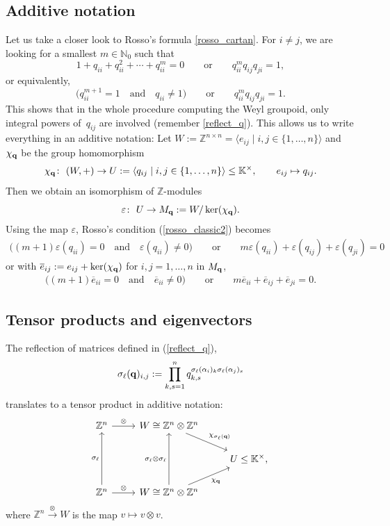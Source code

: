\documentclass[10pt,a4paper]{amsart}
\numberwithin{equation}{section}
\newcommand{\NN }{\mathbb{N}}
\newcommand{\ZZ }{\mathbb{Z}}
\newcommand{\qq }{{\bf q}}
\newcommand{\KK }{\mathbb{K}}
\newcommand{\bich }{\chi}
\begin{document}
\subsection{Additive notation}\label{add_not}
Let us take a closer look to Rosso's formula \eqref{rosso_cartan}. For $i\ne j$, we are looking for a smallest $m\in\NN_0$ such that
\begin{equation*}%
1+q_{ii}+q_{ii}^2+\cdots+q_{ii}^m=0 \qquad\text{or}\qquad q_{ii}^m q_{ij}q_{ji}=1,
\end{equation*}
or equivalently,
\begin{equation}\label{rosso_classic2}
\big(q_{ii}^{m+1}=1\quad\text{and}\quad q_{ii}\ne 1\big) \qquad\text{or}\qquad q_{ii}^m q_{ij}q_{ji}=1.
\end{equation}
This shows that in the whole procedure computing the Weyl groupoid, only integral powers of~$q_{ij}$ are involved (remember \eqref{reflect_q}).
This allows us to write everything in an additive notation:
Let $W:=\ZZ^{n\times n} = \langle e_{ij}\mid i,j\in \{1,\dots,n\}\rangle$ and $\bich_\qq$ be the group homomorphism
\[ \bich_\qq \colon \ (W,+) \rightarrow U:=\langle q_{ij} \mid i,j\in \{1,\dots,n\}\rangle\le \KK^\times,
\qquad e_{ij}\mapsto q_{ij}. \]
Then we obtain an isomorphism of $\ZZ$-modules
\[ \varepsilon \colon \ U \rightarrow M_\qq:=W/\ker(\bich_\qq). \]
Using the map $\varepsilon$, Rosso's condition (\ref{rosso_classic2}) becomes
\begin{gather*}%
\big((m+1)\varepsilon(q_{ii})=0\quad\text{and}\quad \varepsilon(q_{ii})\ne 0\big) \qquad\text{or}\qquad m\varepsilon(q_{ii})+\varepsilon(q_{ij})+\varepsilon(q_{ji})=0
\end{gather*}
or with $\overline{e}_{ij}:=e_{ij}+\ker(\bich_\qq)$ for $i,j=1,\dots,n$ in $M_\qq$,
\begin{gather*}%
\big((m+1)\overline{e}_{ii}=0\quad\text{and}\quad \overline{e}_{ii}\ne 0\big) \qquad\text{or}\qquad m\overline{e}_{ii}+\overline{e}_{ij}+\overline{e}_{ji}=0.
\end{gather*}

\subsection{Tensor products and eigenvectors}\label{add_not_tensor}
The reflection of matrices defined in (\ref{reflect_q}),
\[ \sigma_\ell(\qq)_{i,j} := \prod_{k,s=1}^n q_{k,s}^{\sigma_\ell(\alpha_i)_k \sigma_\ell(\alpha_j)_s} \]
translates to a tensor product in additive notation:
\[
\begin{tikzcd}
\ZZ^n \arrow[r, "\otimes"] & W\cong \ZZ^n\otimes\ZZ^n \arrow[dr, "\bich_{\sigma_\ell(\qq)}"]
& \\
 & & U \le \KK^\times ,\\
 \ZZ^n \arrow[r, "\otimes"] \arrow[uu, "\sigma_\ell"]
 & W\cong \ZZ^n\otimes\ZZ^n \arrow[ur, "\bich_{\qq}", swap] \arrow[uu, "\sigma_\ell \otimes \sigma_\ell"] &
\end{tikzcd}
\]
where $\ZZ^n \stackrel{\otimes}{\longrightarrow} W$ is the map $v \mapsto v\otimes v$.
\end{document}
